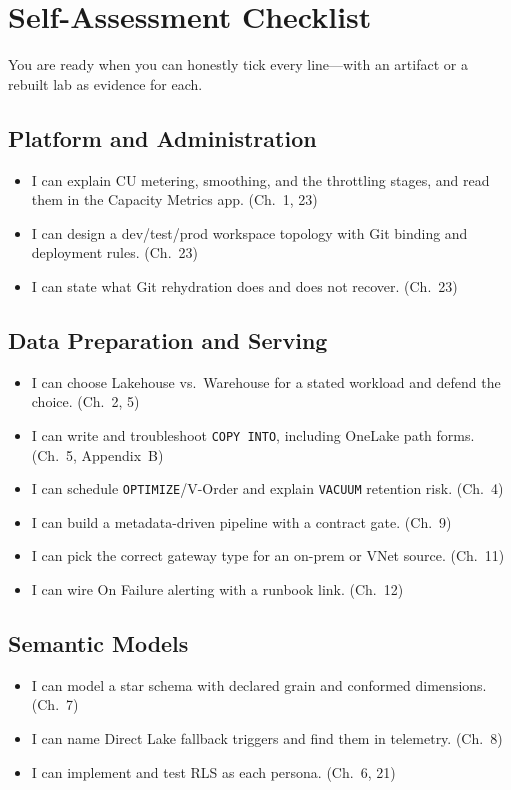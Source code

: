 \section{Self-Assessment Checklist}
%
You are ready when you can honestly tick every line---with an artifact or a rebuilt lab as
evidence for each.

\subsection*{Platform and Administration}
\begin{itemize}
    \item[$\square$] I can explain CU metering, smoothing, and the throttling stages, and read
    them in the Capacity Metrics app. (Ch.~1, 23)
    \item[$\square$] I can design a dev/test/prod workspace topology with Git binding and
    deployment rules. (Ch.~23)
    \item[$\square$] I can state what Git rehydration does and does not recover. (Ch.~23)
\end{itemize}

\subsection*{Data Preparation and Serving}
\begin{itemize}
    \item[$\square$] I can choose Lakehouse vs.\ Warehouse for a stated workload and defend the
    choice. (Ch.~2, 5)
    \item[$\square$] I can write and troubleshoot \texttt{COPY INTO}, including OneLake path
    forms. (Ch.~5, Appendix~B)
    \item[$\square$] I can schedule \texttt{OPTIMIZE}/V-Order and explain \texttt{VACUUM}
    retention risk. (Ch.~4)
    \item[$\square$] I can build a metadata-driven pipeline with a contract gate. (Ch.~9)
    \item[$\square$] I can pick the correct gateway type for an on-prem or VNet source. (Ch.~11)
    \item[$\square$] I can wire On Failure alerting with a runbook link. (Ch.~12)
\end{itemize}

\subsection*{Semantic Models}
\begin{itemize}
    \item[$\square$] I can model a star schema with declared grain and conformed dimensions. (Ch.~7)
    \item[$\square$] I can name Direct Lake fallback triggers and find them in telemetry. (Ch.~8)
    \item[$\square$] I can implement and test RLS as each persona. (Ch.~6, 21)
\end{itemize}


